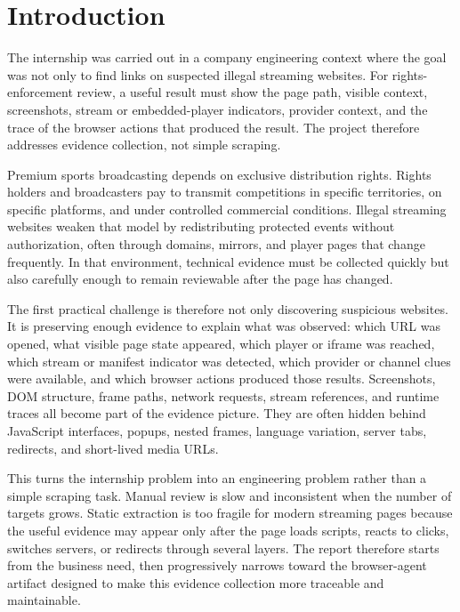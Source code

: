 \chapter{Introduction}

The internship was carried out in a company engineering context where the goal
was not only to find links on suspected illegal streaming websites. For
rights-enforcement review, a useful result must show the page path, visible
context, screenshots, stream or embedded-player indicators, provider context,
and the trace of the browser actions that produced the result. The project
therefore addresses evidence collection, not simple scraping.

Premium sports broadcasting depends on exclusive distribution rights. Rights
holders and broadcasters pay to transmit competitions in specific territories,
on specific platforms, and under controlled commercial conditions. Illegal
streaming websites weaken that model by redistributing protected events without
authorization, often through domains, mirrors, and player pages that change
frequently. In that environment, technical evidence must be collected quickly
but also carefully enough to remain reviewable after the page has changed.

The first practical challenge is therefore not only discovering suspicious
websites. It is preserving enough evidence to explain what was observed:
which URL was opened, what visible page state appeared, which player or iframe
was reached, which stream or manifest indicator was detected, which provider or
channel clues were available, and which browser actions produced those results.
Screenshots, DOM structure, frame paths, network requests, stream references,
and runtime traces all become part of the evidence picture. They are often
hidden behind JavaScript interfaces, popups, nested frames, language variation,
server tabs, redirects, and short-lived media URLs.

This turns the internship problem into an engineering problem rather than a
simple scraping task. Manual review is slow and inconsistent when the number of
targets grows. Static extraction is too fragile for modern streaming pages
because the useful evidence may appear only after the page loads scripts,
reacts to clicks, switches servers, or redirects through several layers. The
report therefore starts from the business need, then progressively narrows
toward the browser-agent artifact designed to make this evidence collection
more traceable and maintainable.

